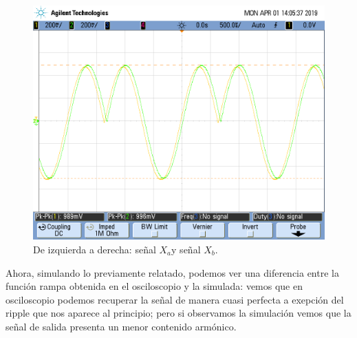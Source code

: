 \documentclass[../../ASSD_TP1_G7.tex]{subfiles}
\begin{document}
\begin{figure}[H]
\begin{centering}
\includegraphics[scale=0.25]{Imagenes/ej_6_b_syh}\caption{De izquierda a derecha: señal $X_{a}$y señal $X_{b}$.}
\par\end{centering}
\end{figure}

Ahora, simulando lo previamente relatado, podemos ver una diferencia
entre la función rampa obtenida en el osciloscopio y la simulada:
vemos que en osciloscopio podemos recuperar la señal de manera cuasi
perfecta a exepción del ripple que nos aparece al principio; pero
si observamos la simulación vemos que la señal de salida presenta
un menor contenido armónico.
\end{document}

